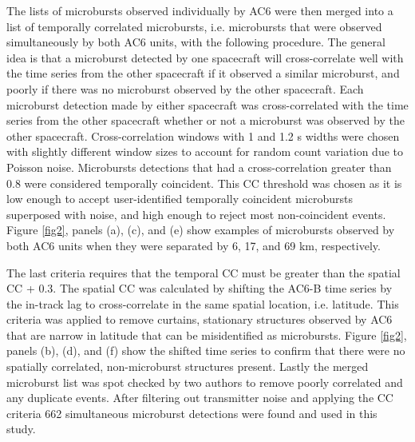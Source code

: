 \documentclass[draft]{agujournal2019}
\begin{document}
The lists of microbursts observed individually by AC6 were then merged into a list of temporally correlated microbursts, i.e. microbursts that were observed simultaneously by both AC6 units, with the following procedure. The general idea is that a microburst detected by one spacecraft will cross-correlate well with the time series from the other spacecraft if it observed a similar microburst, and poorly if there was no microburst observed by the other spacecraft. Each microburst detection made by either spacecraft was cross-correlated with the time series from the other spacecraft whether or not a microburst was observed by the other spacecraft. Cross-correlation windows with 1 and 1.2 s widths were chosen with slightly different window sizes to account for random count variation due to Poisson noise. Microbursts detections that had a cross-correlation greater than $0.8$ were considered temporally coincident. This CC threshold was chosen as it is low enough to accept user-identified temporally coincident microbursts superposed with noise, and high enough to reject most non-coincident events. Figure \ref{fig2}, panels (a), (c), and (e) show examples of microbursts observed by both AC6 units when they were separated by 6, 17, and 69 km, respectively. 

The last criteria requires that the temporal CC must be greater than the spatial CC + 0.3. The spatial CC was calculated by shifting the AC6-B time series by the in-track lag to cross-correlate in the same spatial location, i.e. latitude. This criteria was applied to remove curtains, stationary structures observed by AC6 that are narrow in latitude \cite{Blake2016} that can be misidentified as microbursts. Figure \ref{fig2}, panels (b), (d), and (f) show the shifted time series to confirm that there were no spatially correlated, non-microburst structures present. Lastly the merged microburst list was spot checked by two authors to remove poorly correlated and any duplicate events. After filtering out transmitter noise and applying the CC criteria 662 simultaneous microburst detections were found and used in this study.
\end{document}
